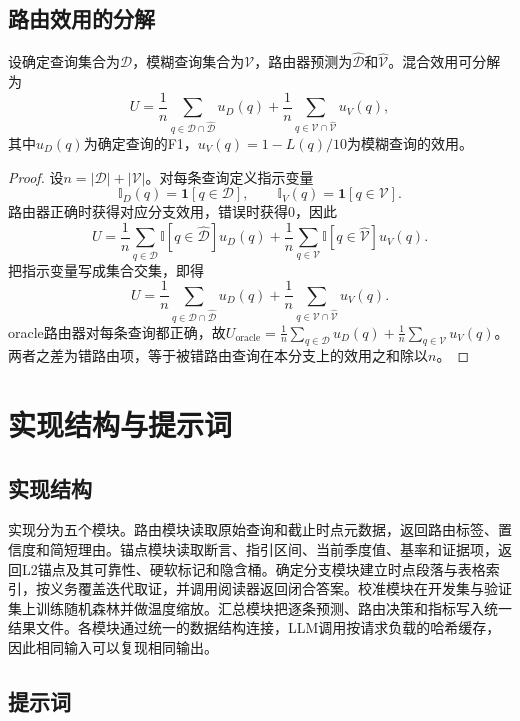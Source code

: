\section{路由效用的分解}

\begin{proposition}
设确定查询集合为$\mathcal D$，模糊查询集合为$\mathcal V$，路由器预测为$\hat{\mathcal D}$和$\hat{\mathcal V}$。混合效用可分解为
\[
U=\frac{1}{n}\sum_{q\in\mathcal D\cap\hat{\mathcal D}}u_D(q)
+\frac{1}{n}\sum_{q\in\mathcal V\cap\hat{\mathcal V}}u_V(q),
\]
其中$u_D(q)$为确定查询的F1，$u_V(q)=1-L(q)/10$为模糊查询的效用。
\end{proposition}

\begin{proof}
设$n=|\mathcal D|+|\mathcal V|$。对每条查询定义指示变量
\[
\mathbb I_D(q)=\mathbf 1[q\in\mathcal D],\qquad
\mathbb I_V(q)=\mathbf 1[q\in\mathcal V].
\]
路由器正确时获得对应分支效用，错误时获得0，因此
\[
U=\frac{1}{n}\sum_{q\in\mathcal D}\mathbb I[q\in\hat{\mathcal D}]u_D(q)
+\frac{1}{n}\sum_{q\in\mathcal V}\mathbb I[q\in\hat{\mathcal V}]u_V(q).
\]
把指示变量写成集合交集，即得
\[
U=\frac{1}{n}\sum_{q\in\mathcal D\cap\hat{\mathcal D}}u_D(q)
+\frac{1}{n}\sum_{q\in\mathcal V\cap\hat{\mathcal V}}u_V(q).
\]
oracle路由器对每条查询都正确，故$U_{\text{oracle}}=\frac{1}{n}\sum_{q\in\mathcal D}u_D(q)+\frac{1}{n}\sum_{q\in\mathcal V}u_V(q)$。两者之差为错路由项，等于被错路由查询在本分支上的效用之和除以$n$。
\end{proof}

\chapter{实现结构与提示词}

\section{实现结构}

实现分为五个模块。路由模块读取原始查询和截止时点元数据，返回路由标签、置信度和简短理由。锚点模块读取断言、指引区间、当前季度值、基率和证据项，返回L2锚点及其可靠性、硬软标记和隐含桶。确定分支模块建立时点段落与表格索引，按义务覆盖迭代取证，并调用阅读器返回闭合答案。校准模块在开发集与验证集上训练随机森林并做温度缩放。汇总模块把逐条预测、路由决策和指标写入统一结果文件。各模块通过统一的数据结构连接，LLM调用按请求负载的哈希缓存，因此相同输入可以复现相同输出。

\section{提示词}

